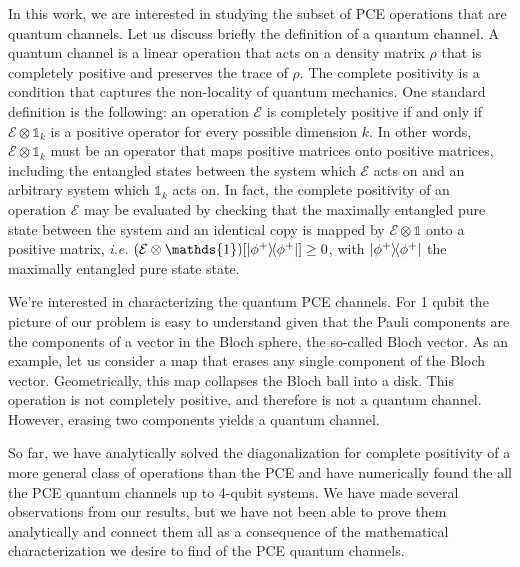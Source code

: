 \documentclass[11pt,dvipsnames]{article} %
\newcommand{\pce}{PCE}
\newcommand{\1}{\mathds{1}}
\begin{document}
In this work, we are interested in studying the subset of PCE operations
that are quantum channels. 
Let us discuss briefly the definition of a quantum channel.
A quantum channel is a linear operation that acts on a density matrix $\rho$
that is completely positive and preserves the trace of $\rho$. The complete
positivity is a condition that captures the non-locality of 
quantum mechanics. One standard definition is the following: an operation
$\mathcal{E}$ is completely positive if and only if $\mathcal{E}\otimes\1_k$
is a positive operator for every possible dimension $k$. In other words, 
$\mathcal{E}\otimes\1_k$ must be an operator that maps positive 
matrices onto positive matrices, including the entangled states between 
the system which $\mathcal{E}$ acts on and an arbitrary system 
which $\1_k$ acts on. In fact, the complete positivity of an operation 
$\mathcal{E}$ may be evaluated by checking that the maximally 
entangled pure state between the system and an identical copy is mapped 
by $\mathcal{E}\otimes\1$ onto a positive matrix, \textit{i.e.}
$\qty(\mathcal{E}\otimes\1)\qty[\dyad{\phi^+}{\phi^+}]\geq 0$, with 
$\dyad{\phi^+}{\phi^+}$ the maximally entangled pure state state.

We're interested in characterizing the quantum PCE channels.
For 1 qubit the picture of our problem is easy to understand given that 
the Pauli components are the components of a vector in the Bloch sphere,
the so-called Bloch vector. 
As an example, let us consider a map that erases any single
component of the Bloch vector. Geometrically, this map collapses 
the Bloch ball into a disk. This operation is not completely positive, and
therefore is not a quantum channel.  However, erasing two components yields 
a quantum channel.

So far, we have analytically solved the diagonalization for 
complete positivity of a more general class of operations than the PCE 
and have numerically found the all the PCE quantum channels up to 
4-qubit systems. We have made several observations from our results, but
we have not been able to prove them analytically and connect them 
all as a consequence of the mathematical characterization we desire
to find of the PCE quantum channels.
%
\end{document}
